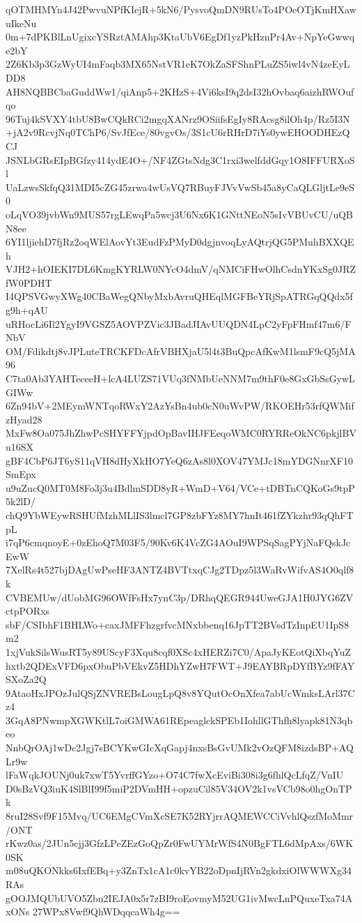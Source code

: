 qOTMHMYn4J42PwvuNPfKIejR+5kN6/PysvoQmDN9RUsTo4POeOTjKmHXawuIkeNu
0m+7dPKBlLnUgixcYSRztAMAhp3KtaUbV6EgDf1yzPkHznPr4Av+NpYeGwwqe2bY
2Z6Kb3p3GzWyUI4mFaqb3MX65NstVR1eK7OkZaSFShnPLuZS5iwl4vN4zeEyLDD8
AH8NQBBCbaGuddWw1/qiAnp5+2KHzS+4Vi6ksI9q2dsI32hOvbaq6aizhRWOufqo
96Tuj4kSVXY4tbU8BwCQkRCi2mgqXANrz9OSiifsEgIy8RAcsg8ilOh4p/Rz5I3N
+jA2v9RcvjNq0TChP6/SvJfEce/80vgvOs/3S1cU6rRHrD7iYs0ywEHOODHEzQCJ
JSNLbGRsEIpBGfzy414ydE4O+/NF4ZGtsNdg3C1rxi3welfddGqy1O8IFFURXoSl
UaLzwsSkfqQ31MDI5cZG45zrwa4wUsVQ7RBuyFJVvVwSb45a8yCaQLGljtLe9eS0
oLqVO39jvbWn9MUS57rgLEwqPa5wcj3U6Nx6K1GNttNEoN5sIvVBUvCU/uQBN8ee
6YI1ljiehD7fjRz2oqWElAovYt3EudFzPMyD0dgjnvoqLyAQtrjQG5PMuhBXXQEh
VJH2+hOIEKI7DL6KmgKYRLW0NYcO4dmV/qNMCiFHwOlhCsdnYKxSg0JRZfW0PDHT
I4QPSVGwyXWg40CBaWegQNbyMxbAvruQHEqlMGFBeYRjSpATRGqQQdx5fg9h+qAU
uRHocLi6Il2YgyI9VGSZ5AOVPZVic3JBadJIAvUUQDN4LpC2yFpFHmf47m6/FNbV
OM/Fdikdtj8vJPLuteTRCKFDcAfrVBHXjaU5l4t3BuQpcAfKwM1lsmF9cQ5jMA96
C7ta0Ab3YAHTeceeH+lcA4LUZS71VUq3fNMbUeNNM7m9thF0e8GxGbSsGywLGIWw
6Zn94bV+2MEymWNTqoRWxY2AzYsBn4ub0cN0uWvPW/RKOEHr53rfQWMifzHyad28
MxFw8Oa075JhZhwPcSHYFFYjpdOpBavIHJFEeqoWMC0RYRReOkNC6pkjlBVu16SX
gBF4CbP6JT6yS11qVH8dHyXkHO7YeQ6zAs8l0XOV47YMJc18mYDGNnrXF10SmEpx
u9uZucQ0MT0M8Fo3j3u4BdlmSDD8yR+WmD+V64/VCe+tDBTnCQKoGs9tpP5k2lD/
chQ9YbWEywRSHUfMzhMLlIS3lmcl7GP8zbFYz8MY7hnIt461fZYkzhr93qQhFTpL
i7qP6cmqnoyE+0zEhoQ7M03F5/90Kv6K4VcZG4AOuI9WPSqSagPYjNaFQskJcEwW
7XelRs4t527bjDAgUwPseHF3ANTZ4BVTtxqCJg2TDpz5l3WaRvWifvAS4O0qlf8k
CVBEMUw/dUobMG96OWfFsHx7ynC3p/DRhqQEGR944UweGJA1H0JYG6ZVctpPORxs
sbF/CSIbhF1BHLWo+caxJMFFhzgrfvcMNxbbenq16JpTT2BVsdTzInpEU1IpS8m2
1xjVukSilsWusRT5y89UScyF3Xqu8cqf0XSc4xHERZi7C0/ApaJyKEotQiXbqYuZ
hxtb2QDExVFD6pxObuPbVEkvZ5HDhYZwH7FWT+J9EAYBRpDYfBYz9fFAYSXoZa2Q
9AtaoHxJPOzJulQSjZNVREBsLougLpQ8v8YQutOcOnXfea7abUcWmksLArl37Cz4
3GqA8PNwmpXGWKtlL7oiGMWA61REpeaglckSPEb1IohllGThfh8lyapk81N3qbeo
NnbQrOAj1wDc2Jgj7sBCYKwGIcXqGapj4nxsBsGvUMk2vOzQFM8izdsBP+AQLr9w
lFaWqkJOUNj0uk7xwT5YvrffGYzo+O74C7fwXcEviBi308i3g6fhlQcLfqZ/VnIU
D0sBzVQ3iuK4SlBlI99f5miP2DVmHH+opzuCil85V34OV2k1vsVCb98o0hgOnTPk
8ruI28Svf9F15Mvq/UC6EMgCVmXcSE7K52RYjrrAQMEWCCiVvhlQszfMoMmr/ONT
rKwz0as/2JUn5cjj3GfzLPeZEzGoQpZr0FwUYMrWfS4N0BgFTL6dMpAxs/6WK0SK
m08uQKONkks6IxfEBq+y3ZnTx1cA1c0kvYB22oDpnIjRVn2gkdxiOlWWWXg34RAs
gOOJMQUbUVO5Zbn2IEJA0x5r7zBI9roEovmyM52UG1ivMwcLnPQuxeTxa74AxONs
27WPx8Vwf9QhWDqqcaWh4g==
